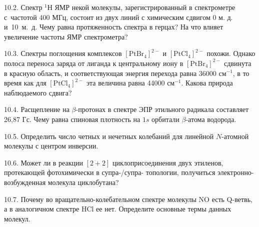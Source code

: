 10.2. Спектр $^{1}$Н ЯМР некой молекулы, зарегистрированный в спектрометре с~частотой 400 МГц, состоит из двух линий с химическим сдвигом 0 м. д. и~10~м.~д. Чему равна протяженность спектра в герцах? На что влияет увеличение частоты ЯМР спектрометра?\par
10.3. Спектры поглощения комплексов $[\text{PtBr}_4]^{2-}$ и $[\text{PtCl}_4]^{2-}$ похожи. Однако полоса переноса заряда от лиганда к центральному иону в $[\text{PtBr}_4]^{2-}$ сдвинута в красную область, и соответствующая энергия перехода равна 36000 см$^{-1}$, в то время как для $[\text{PtCl}_4]^{2-}$ эта величина равна 44000 см$^{-1}$. Какова природа наблюдаемого сдвига?\par
10.4. Расщепление на $\beta$-протонах в спектре ЭПР этильного радикала составляет 26,87 Гс. Чему равна спиновая плотность на $1s$ орбитали $\beta$-атома водорода.\par
10.5. Определить число четных и нечетных колебаний для линейной $N$-атомной молекулы с центром инверсии.\par
10.6. Может ли в реакции $[2+2]$ циклоприсоединения двух этиленов, протекающей фотохимически в супра-/супра- топологии, получиться электронно-возбужденная молекула циклобутана?\par
10.7. Почему во вращательно-колебательном спектре молекулы NO есть Q-ветвь, а в аналогичном спектре HCl ее нет. Определите основные термы данных молекул.\par


